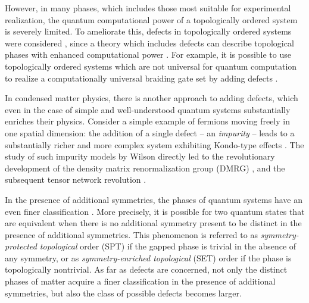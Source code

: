 \documentclass[aps,prx,twocolumn,superscriptaddress,noshowkeys]{revtex4-2}  %
\theoremstyle{plain}%
\theoremstyle{definition}
\theoremstyle{remark}
\begin{document}
However, in many phases, which includes those most suitable for experimental realization, the quantum computational power of a topologically ordered system is severely limited. To ameliorate this, defects in topologically ordered systems were considered \cite{RH07,Bombin2010,KK12,FSV13,BJQ13b,BASP14,JPSV15,DIP16,CCW16,BBD17,CCW17b,CCW17,BLKW17,KPEB18,ET19}, since a theory which includes defects can describe topological phases with enhanced computational power \cite{Freedman1998,FLW02b,FLW02,FKLW02}. For example, it is possible to use topologically ordered systems which are not universal for quantum computation to realize a computationally universal braiding gate set by adding defects \cite{BJQ13}.

In condensed matter physics, there is another approach to adding defects, which even in the case of simple and well-understood quantum systems substantially enriches their physics. Consider a simple example of fermions moving freely in one spatial dimension: the addition of a single defect -- an \emph{impurity} -- leads to a substantially richer and more complex system exhibiting Kondo-type effects \cite{andersonLocalizedMagneticStates1961,hewsonKondoProblemHeavy1997}. The study of such impurity models by Wilson \cite{wilsonRenormalizationGroupCritical1975} directly led to the revolutionary development of the density matrix renormalization group (DMRG) \cite{whiteDensityMatrixFormulation1992}, and the subsequent tensor network revolution \cite{bridgemanHandwavingInterpretiveDance2017}.

In the presence of additional symmetries, the phases of quantum systems have an even finer classification \cite{Wen2002,SRFL08,Kitaev2009,FK10,CGW11,FK11,TPB11,LS12,LV12,FM13,EH13,NCMT14,WPS14,K14,F14,EN14,MFCV15,BRSX15,LV16}. More precisely, it is possible for two quantum states that are equivalent when there is no additional symmetry present to be distinct in the presence of additional symmetries. This phenomenon is referred to as \emph{symmetry-protected topological} order (SPT) \cite{CGLW13,Yoshida2015,Yoshida2017} if the gapped phase is trivial in the absence of any symmetry, or as \emph{symmetry-enriched topological} (SET) order \cite{ENO10,MR13,WBV17} if the phase is topologically nontrivial. As far as defects are concerned, not only the distinct phases of matter acquire a finer classification in the presence of additional symmetries, but also the class of possible defects becomes larger. 
\end{document}
